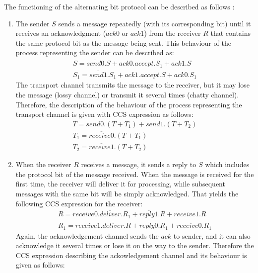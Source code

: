 The functioning of the alternating bit protocol can be described as follows \cite{ReactiveSystems}:
\begin{enumerate}
	\item The sender $S$ sends a message repeatedly (with its corresponding bit) until it receives an acknowledgment ($ack0$ or $ack1$) from the receiver $R$ that contains the same protocol bit as the message being sent. This behaviour of the process representing the sender can be described as:
				\begin{equation*}\label{send_imp}
				    \begin{array}{lcl}
							S = \overline{send0}.S+ack0.accept.S_{1}+ack1.S \\
							S_{1}=\overline{send1}.S_{1}+ack1.accept.S+ack0.S_{1}				  
						\end{array}
				\end{equation*}
	      The transport channel transmits the message to the receiver, but it may lose the message (lossy channel) or transmit it several times (chatty channel). Therefore, the description of the behaviour of the process representing the transport channel is given with CCS expression as follows:
	      \begin{equation*}\label{trans_imp}
	      	\begin{array}{lcl}
						T=send0.\left(T+T_{1}\right)+send1.\left(T+T_{2}\right)\\
						T_{1}=\overline{receive0}.\left(T+T_{1}\right)\\
						T_{2}=\overline{receive1}.\left(T+T_{2}\right)
					\end{array}
				\end{equation*}
  \item When the receiver $R$ receives a message, it sends a reply to $S$ which includes the protocol bit of the message received. When the message is received for the first time, the receiver will deliver it for processing, while subsequent messages with the same bit will be simply acknowledged. That yields the following CCS expression for the receiver:
  			\begin{equation*}\label{rec_imp}
				    \begin{array}{lcl}
							R=receive0.\overline{deliver}.R_{1}+\overline{reply1}.R+receive1.R \\
							R_{1}=receive1.\overline{deliver}.R+\overline{reply0}.R_{1}+receive0.R_{1}			  
						\end{array}
				\end{equation*}
        Again, the acknowledgement channel sends the $ack$ to sender, and it can also acknowledge it several times or lose it on the way to the sender. Therefore the CCS expression describing the ackowledgement channel and its behaviour is given as follows:

\end{enumerate}
